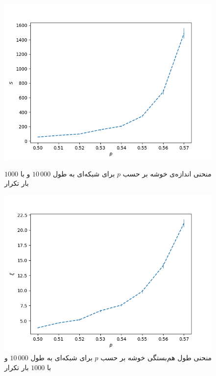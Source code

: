 \documentclass[11pt, a4paper]{article}
\begin{document}
\begin{figure}[h]
	\centering
  \begin{minipage}[b]{0.48\textwidth}
    \includegraphics[width=\textwidth]{q7_sizes_0.5_0.01_0.58_1000_10000.png}
    \caption{منحنی اندازه‌ی خوشه بر حسب $p$ برای شبکه‌ای به طول $10\,000$ و با $1000$ بار تکرار}
    \label{fig:q7_size}
  \end{minipage}
  \hfill
  \begin{minipage}[b]{0.48\textwidth}
    \includegraphics[width=\textwidth]{q7_radii_0.5_0.01_0.58_1000_10000.png}
    \caption{منحنی طول هم‌بستگی خوشه بر حسب $p$ برای شبکه‌ای به طول $10\,000$ و با $1000$ بار تکرار}
    \label{fig:q7_radii}
  \end{minipage}
\end{figure}
\end{document}
